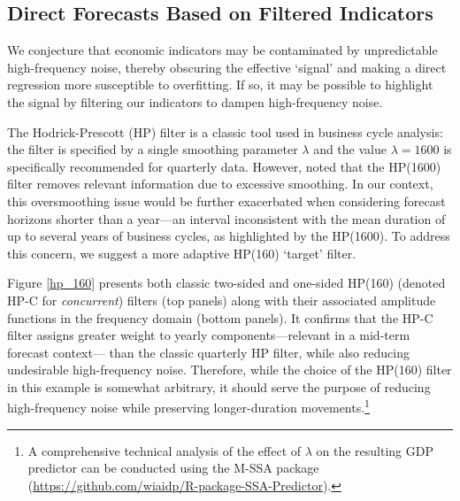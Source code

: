 \documentclass[11pt,a4paper]{article}
\begin{document}

\subsection{Direct Forecasts Based on Filtered Indicators}\label{hpdf}

We conjecture that economic indicators may be contaminated by unpredictable high-frequency noise, thereby obscuring the effective `signal' and making a direct regression more susceptible to overfitting. If so, it may be possible to highlight the signal by filtering our indicators to dampen high-frequency noise. 

The Hodrick-Prescott (HP) filter is a classic tool used in business cycle analysis: the filter is specified by a single smoothing parameter $\lambda$ and the value $\lambda=1600$ is specifically recommended for quarterly data. However, \cite{Phillips_Jin_2021} noted that the HP(1600) filter removes relevant information due to excessive smoothing. In our context, this oversmoothing issue would be further exacerbated when considering forecast horizons shorter than a year---an interval inconsistent with the mean duration of up to several years of business cycles, as highlighted by the HP(1600). To address this concern, we suggest a more adaptive HP(160) `target' filter. 

Figure \ref{hp_160} presents both classic two-sided and one-sided HP(160) (denoted HP-C for \textit{concurrent}) filters (top panels) along with their associated amplitude functions in the frequency domain (bottom panels). It confirms that the HP-C filter assigns greater weight to yearly components—relevant in a mid-term forecast context— than the classic quarterly HP filter, while also reducing undesirable high-frequency noise. Therefore, while the choice of the HP(160) filter in this example
is somewhat arbitrary, it should serve the purpose of reducing high-frequency noise while preserving longer-duration movements.\footnote{A comprehensive technical analysis of the effect of $\lambda$ on the resulting GDP predictor can be conducted using the M-SSA package (\url{https://github.com/wiaidp/R-package-SSA-Predictor}).}
\end{document}

